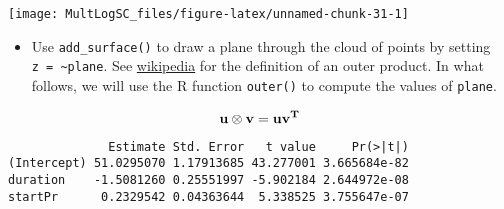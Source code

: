 \documentclass[]{book}
\newenvironment{Shaded}{\begin{snugshade}}{\end{snugshade}}
\newcommand{\KeywordTok}[1]{\textcolor[rgb]{0.13,0.29,0.53}{\textbf{#1}}}
\newcommand{\DataTypeTok}[1]{\textcolor[rgb]{0.13,0.29,0.53}{#1}}
\newcommand{\DecValTok}[1]{\textcolor[rgb]{0.00,0.00,0.81}{#1}}
\newcommand{\FloatTok}[1]{\textcolor[rgb]{0.00,0.00,0.81}{#1}}
\newcommand{\StringTok}[1]{\textcolor[rgb]{0.31,0.60,0.02}{#1}}
\newcommand{\CommentTok}[1]{\textcolor[rgb]{0.56,0.35,0.01}{\textit{#1}}}
\newcommand{\OtherTok}[1]{\textcolor[rgb]{0.56,0.35,0.01}{#1}}
\newcommand{\ControlFlowTok}[1]{\textcolor[rgb]{0.13,0.29,0.53}{\textbf{#1}}}
\newcommand{\OperatorTok}[1]{\textcolor[rgb]{0.81,0.36,0.00}{\textbf{#1}}}
\newcommand{\NormalTok}[1]{#1}
\providecommand{\tightlist}{%
  \setlength{\itemsep}{0pt}\setlength{\parskip}{0pt}}
\begin{document}
\begin{center}\texttt{[image: MultLogSC\_files/figure-latex/unnamed-chunk-31-1]} \end{center}

\begin{itemize}
\tightlist
\item
  Use \texttt{add\_surface()} to draw a plane through the cloud of
  points by setting \texttt{z\ =\ \textasciitilde{}plane}. See
  \href{https://en.wikipedia.org/wiki/Outer_product}{wikipedia} for the
  definition of an outer product. In what follows, we will use the R
  function \texttt{outer()} to compute the values of \texttt{plane}.
\end{itemize}

\[\bf{u \otimes v} = \bf{uv^T}\]

\begin{Shaded}
\end{Shaded}

\begin{verbatim}
              Estimate Std. Error   t value     Pr(>|t|)
(Intercept) 51.0295070 1.17913685 43.277001 3.665684e-82
duration    -1.5081260 0.25551997 -5.902184 2.644972e-08
startPr      0.2329542 0.04363644  5.338525 3.755647e-07
\end{verbatim}

\begin{Shaded}
\end{Shaded}
\end{document}
